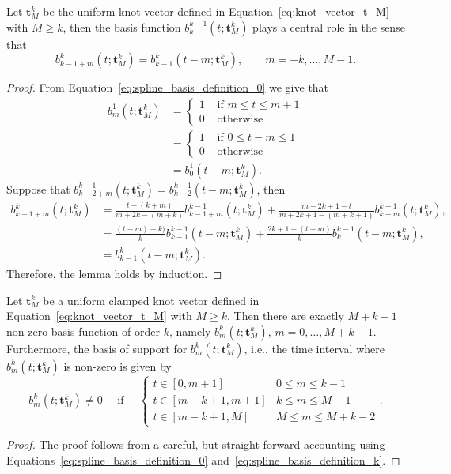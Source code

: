\begin{lemma} \label{lem:shifted_central_basis}
Let $\mathbf{t}_M^k$ be the uniform knot vector defined in Equation~\eqref{eq:knot_vector_t_M} with $M\geq k$, then the basis function $b_k^{k-1}(t; \mathbf{t}_M^k)$ plays a central role in the sense that
\[
	b_{k-1+m}^{k}(t; \mathbf{t}_M^k) = b_{k-1}^k(t-m; \mathbf{t}_M^k), \qquad m=-k, \dots, M-1.
\]
\end{lemma}
\begin{proof}
From Equation~\eqref{eq:spline_basis_definition_0} we give that
\begin{align*}
	b_m^1(t; \mathbf{t}_M^k) &= \begin{cases} 1 & \text{~if~} m \leq t \leq m+1 \\ 
 									 		  0 & \text{~otherwise} 
 					   			\end{cases} 
 					   		\\
 					   		 &= \begin{cases} 1 & \text{~if~} 0 \leq t-m \leq 1 \\ 
 									 		  0 & \text{~otherwise} 
 					   			\end{cases} 
 					   		\\
 					   		&= b_0^1(t-m; \mathbf{t}_M^k).
\end{align*}
Suppose that $b_{k-2+m}^{k-1}(t; \mathbf{t}_M^k) = b_{k-2}^{k-1}(t-m; \mathbf{t}_M^k)$, then
\begin{align*}
b_{k-1+m}^{k}(t; \mathbf{t}_M^k) 
	&= \frac{t-(k+m)}{m+2k-(m+k)} b_{k-1+m}^{k-1}(t; \mathbf{t}_M^k) + \frac{m+2k+1-t}{m+2k+1-(m+k+1)} b_{k+m}^{k-1}(t; \mathbf{t}_M^k),
	\\	
	&= \frac{(t-m)-k)}{k} b_{k-1}^{k-1}(t-m; \mathbf{t}_M^k) + \frac{2k+1-(t-m)}{k} b_{k1}^{k-1}(t-m; \mathbf{t}_M^k),
	\\
	&= b_{k-1}^k(t-m; \mathbf{t}_M^k).
\end{align*}
Therefore, the lemma holds by induction.
\end{proof}



\begin{lemma} \label{lem:nonzero_basis_vectors}
	Let $\mathbf{t}_M^k$ be a uniform clamped knot vector defined in Equation~\eqref{eq:knot_vector_t_M} with $M\geq k$.
	Then there are exactly $M+k-1$ non-zero basis function of order $k$, namely $b_m^k(t;\mathbf{t}_M^k)$, $m=0, \dots, M+k-1$.
	Furthermore, the basis of support for $b_m^k(t;\mathbf{t}_M^k)$, i.e., the time interval where $b_m^k(t;\mathbf{t}_M^k)$ is non-zero is given by
		\[
				b_m^k(t;\mathbf{t}_M^k) \neq 0 
				\quad \text{~if~} \quad
				\begin{cases}
				t \in [0, m+1] & 0\leq m \leq k-1 \\
				t \in [m-k+1, m+1] & k \leq m \leq M-1 \\
				t \in [m-k+1, M] & M \leq m \leq M+k-2
				\end{cases}.
		\]	
\end{lemma}
\begin{proof}  The proof follows from a careful, but straight-forward accounting using Equations~\eqref{eq:spline_basis_definition_0} and~\eqref{eq:spline_basis_definition_k}.	
\end{proof}

